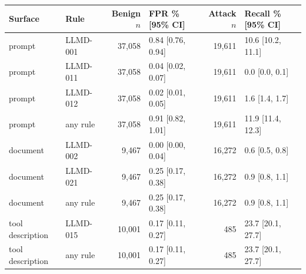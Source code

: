 \begin{tabular}{llrlrl}
\toprule
Surface & Rule & Benign $n$ & FPR \% [95\% CI] & Attack $n$ & Recall \% [95\% CI] \\
\midrule
prompt & LLMD-001 & 37,058 & 0.84 [0.76, 0.94] & 19,611 & 10.6 [10.2, 11.1] \\
prompt & LLMD-011 & 37,058 & 0.04 [0.02, 0.07] & 19,611 & 0.0 [0.0, 0.1] \\
prompt & LLMD-012 & 37,058 & 0.02 [0.01, 0.05] & 19,611 & 1.6 [1.4, 1.7] \\
prompt & any rule & 37,058 & 0.91 [0.82, 1.01] & 19,611 & 11.9 [11.4, 12.3] \\
document & LLMD-002 & 9,467 & 0.00 [0.00, 0.04] & 16,272 & 0.6 [0.5, 0.8] \\
document & LLMD-021 & 9,467 & 0.25 [0.17, 0.38] & 16,272 & 0.9 [0.8, 1.1] \\
document & any rule & 9,467 & 0.25 [0.17, 0.38] & 16,272 & 0.9 [0.8, 1.1] \\
tool description & LLMD-015 & 10,001 & 0.17 [0.11, 0.27] & 485 & 23.7 [20.1, 27.7] \\
tool description & any rule & 10,001 & 0.17 [0.11, 0.27] & 485 & 23.7 [20.1, 27.7] \\
\bottomrule
\end{tabular}
